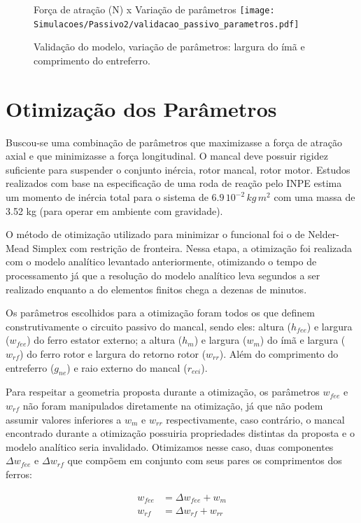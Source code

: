\begin{figure}[th!]
	\centering
	Força de atração (N) x Variação de parâmetros
	\texttt{[image: Simulacoes/Passivo2/validacao\_passivo\_parametros.pdf]}
	\caption{Validação do modelo, variação de parâmetros: largura do ímã e comprimento do entreferro.}
	\label{fig:validacao_passivo_parametros}
\end{figure} 

\section{Otimização dos Parâmetros}

Buscou-se uma combinação de parâmetros que maximizasse a força de atração axial e que minimizasse a força longitudinal. O mancal deve possuir rigidez suficiente para suspender o conjunto inércia, rotor mancal, rotor motor. Estudos realizados com base na especificação de uma roda de reação pelo INPE estima um momento de inércia total para o sistema de $6.9 \, 10^{-2} \, kg \, m^2$ com uma massa de 3.52 kg (para operar em ambiente com gravidade). 

O método de otimização utilizado para minimizar o funcional foi o de Nelder-Mead Simplex com restrição de fronteira. Nessa etapa, a otimização foi realizada com o modelo analítico levantado anteriormente, otimizando o tempo de processamento já que a resolução do modelo analítico leva segundos a ser realizado enquanto a do elementos finitos chega a dezenas de minutos.

Os parâmetros escolhidos para a otimização foram todos os que definem construtivamente o circuito passivo do mancal, sendo eles: altura  ($h_{fee}$) e largura  ($w_{fee}$) do ferro estator externo; a altura ($h_m$) e largura ($w_m$) do ímã e largura ($w_{rf}$) do ferro rotor e largura do retorno rotor ($w_{rr}$). Além do comprimento do entreferro ($g_{ne}$) e raio externo do mancal ($r_{eei}$).

Para respeitar a geometria proposta durante a otimização, os parâmetros $w_{fee}$ e $w_{rf}$ não foram manipulados diretamente na otimização, já que não podem assumir valores inferiores a $w_m$ e $w_{rr}$ respectivamente, caso contrário, o mancal encontrado durante a otimização possuiria propriedades distintas da proposta e o modelo analítico seria invalidado. Otimizamos nesse caso, duas componentes $\Delta w_{fee}$ e $\Delta w_{rf}$ que compõem em conjunto com seus pares os comprimentos dos ferros:

\begin{align}
w_{fee}  &= \Delta w_{fee} + w_m \\
w_{rf} &= \Delta w_{rf} + w_{rr}
\end{align}	

